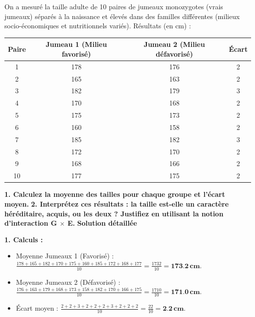 \documentclass[11pt]{article}
\begin{document}
\begin{exoresolu}
On a mesuré la taille adulte de 10 paires de jumeaux monozygotes (vrais jumeaux) séparés à la naissance et élevés dans des familles différentes (milieux socio-économiques et nutritionnels variés). Résultats (en cm) :

\begin{center}
\begin{tabular}{|c|c|c|c|}\hline
\rowcolor{popblueL} \textbf{Paire} & \textbf{Jumeau 1 (Milieu favorisé)} & \textbf{Jumeau 2 (Milieu défavorisé)} & \textbf{Écart} \\ \hline
1 & 178 & 176 & 2 \\
2 & 165 & 163 & 2 \\
3 & 182 & 179 & 3 \\
4 & 170 & 168 & 2 \\
5 & 175 & 173 & 2 \\
6 & 160 & 158 & 2 \\
7 & 185 & 182 & 3 \\
8 & 172 & 170 & 2 \\
9 & 168 & 166 & 2 \\
10 & 177 & 175 & 2 \\ \hline
\end{tabular}
\end{center}

\textbf{1. Calculez la moyenne des tailles pour chaque groupe et l'écart moyen.}
\textbf{2. Interprétez ces résultats : la taille est-elle un caractère héréditaire, acquis, ou les deux ? Justifiez en utilisant la notion d'interaction G $\times$ E.}
\tcblower
\textbf{Solution détaillée}

\textbf{1. Calculs :}
\begin{itemize}
    \item Moyenne Jumeaux 1 (Favorisé) : $\frac{178+165+182+170+175+160+185+172+168+177}{10} = \frac{1732}{10} = \mathbf{\num{173,2}\,\text{cm}}$.
    \item Moyenne Jumeaux 2 (Défavorisé) : $\frac{176+163+179+168+173+158+182+170+166+175}{10} = \frac{1710}{10} = \mathbf{\num{171,0}\,\text{cm}}$.
    \item Écart moyen : $\frac{2+2+3+2+2+2+3+2+2+2}{10} = \frac{22}{10} = \mathbf{\num{2,2}\,\text{cm}}$.
\end{itemize}


\end{exoresolu}
\end{document}
